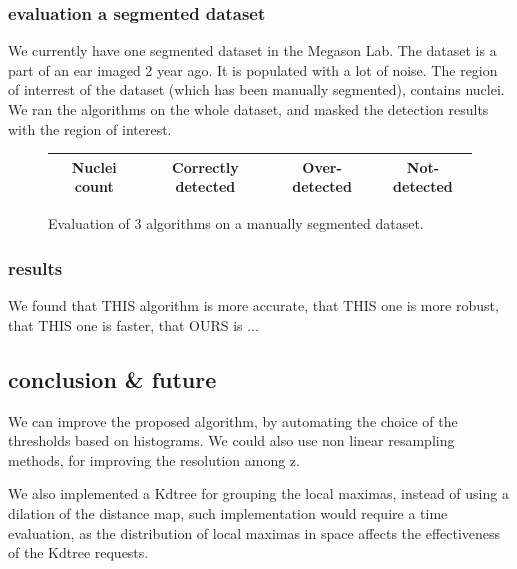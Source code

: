 \subsubsection{evaluation a segmented dataset}

We currently have one segmented dataset in the Megason Lab. The dataset is a part of an ear imaged 2 year ago. It is populated with a lot of noise. The region of interrest of the dataset (which has been manually segmented), contains  nuclei.
We ran the algorithms on the whole dataset, and masked the detection results with the region of interest.

\begin{figure}[htb]
\begin{center}
\begin{tabular}{|c|c|c|c|}
\hline Nuclei count & Correctly detected & Over-detected & Not-detected \\ 
\hline
\end{tabular} 
\end{center}
\caption{Evaluation of 3 algorithms on a manually segmented dataset.}
\label{tab:DataSizes}
\end{figure}

\subsubsection{results}

\TODO{}
We found that THIS algorithm is more accurate, that THIS one is more robust, that THIS one is faster, that OURS is ...

\subsection{conclusion \& future}


We can improve the proposed algorithm, by automating the choice of the thresholds based on histograms.
We could also use non linear resampling methods, for improving the resolution among z.

We also implemented a Kdtree for grouping the local maximas, instead of using a dilation of the distance map,
such implementation would require a time evaluation, as the distribution of local maximas in space affects the effectiveness of the Kdtree requests.

